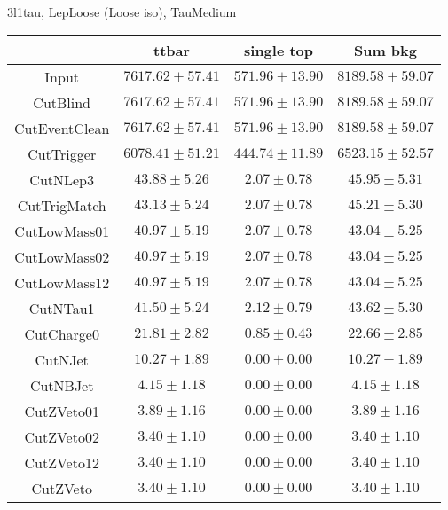 \documentclass[11pt]{article}
\begin{document}
3l1tau, LepLoose (Loose iso), TauMedium \\
\begin{tabular}{|c|c|c|c|}
\hline
              & ttbar               & single top         & Sum bkg            \\
\hline
Input         & $7617.62 \pm 57.41$ & $571.96 \pm 13.90$ & $8189.58 \pm 59.07$\\
CutBlind      & $7617.62 \pm 57.41$ & $571.96 \pm 13.90$ & $8189.58 \pm 59.07$\\
CutEventClean & $7617.62 \pm 57.41$ & $571.96 \pm 13.90$ & $8189.58 \pm 59.07$\\
CutTrigger    & $6078.41 \pm 51.21$ & $444.74 \pm 11.89$ & $6523.15 \pm 52.57$\\
CutNLep3      &    $43.88 \pm 5.26$ &    $2.07 \pm 0.78$ &    $45.95 \pm 5.31$\\
CutTrigMatch  &    $43.13 \pm 5.24$ &    $2.07 \pm 0.78$ &    $45.21 \pm 5.30$\\
CutLowMass01  &    $40.97 \pm 5.19$ &    $2.07 \pm 0.78$ &    $43.04 \pm 5.25$\\
CutLowMass02  &    $40.97 \pm 5.19$ &    $2.07 \pm 0.78$ &    $43.04 \pm 5.25$\\
CutLowMass12  &    $40.97 \pm 5.19$ &    $2.07 \pm 0.78$ &    $43.04 \pm 5.25$\\
CutNTau1      &    $41.50 \pm 5.24$ &    $2.12 \pm 0.79$ &    $43.62 \pm 5.30$\\
CutCharge0    &    $21.81 \pm 2.82$ &    $0.85 \pm 0.43$ &    $22.66 \pm 2.85$\\
CutNJet       &    $10.27 \pm 1.89$ &    $0.00 \pm 0.00$ &    $10.27 \pm 1.89$\\
CutNBJet      &     $4.15 \pm 1.18$ &    $0.00 \pm 0.00$ &     $4.15 \pm 1.18$\\
CutZVeto01    &     $3.89 \pm 1.16$ &    $0.00 \pm 0.00$ &     $3.89 \pm 1.16$\\
CutZVeto02    &     $3.40 \pm 1.10$ &    $0.00 \pm 0.00$ &     $3.40 \pm 1.10$\\
CutZVeto12    &     $3.40 \pm 1.10$ &    $0.00 \pm 0.00$ &     $3.40 \pm 1.10$\\
CutZVeto      &     $3.40 \pm 1.10$ &    $0.00 \pm 0.00$ &     $3.40 \pm 1.10$\\
\hline
\end{tabular}
\end{document}
